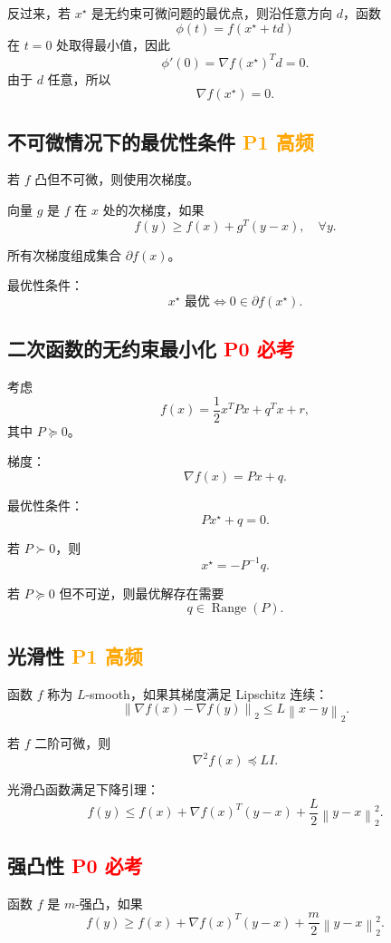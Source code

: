\documentclass[11pt,a4paper]{ctexart}
\newcommand{\norm}[1]{\left\lVert #1 \right\rVert}
\newcommand{\Pzero}{\textcolor{red}{\textbf{P0 必考}}}
\newcommand{\Pone}{\textcolor{orange}{\textbf{P1 高频}}}
\theoremstyle{definition}
\theoremstyle{plain}
\theoremstyle{remark}
\begin{document}
反过来，若 $x^\star$ 是无约束可微问题的最优点，则沿任意方向 $d$，函数
\[
    \phi(t)=f(x^\star+td)
\]
在 $t=0$ 处取得最小值，因此
\[
    \phi'(0)=\nabla f(x^\star)^Td=0.
\]
由于 $d$ 任意，所以
\[
    \nabla f(x^\star)=0.
\]

\subsection{不可微情况下的最优性条件 \Pone}

若 $f$ 凸但不可微，则使用次梯度。

向量 $g$ 是 $f$ 在 $x$ 处的次梯度，如果
\[
    f(y)\ge f(x)+g^T(y-x),\quad \forall y.
\]

所有次梯度组成集合 $\partial f(x)$。

最优性条件：
\[
    x^\star\text{ 最优}
    \Longleftrightarrow
    0\in\partial f(x^\star).
\]

\subsection{二次函数的无约束最小化 \Pzero}

考虑
\[
    f(x)=\frac12x^TPx+q^Tx+r,
\]
其中 $P\succeq0$。

梯度：
\[
    \nabla f(x)=Px+q.
\]

最优性条件：
\[
    Px^\star+q=0.
\]

若 $P\succ0$，则
\[
    x^\star=-P^{-1}q.
\]

若 $P\succeq0$ 但不可逆，则最优解存在需要
\[
    q\in \operatorname{Range}(P).
\]

\subsection{光滑性 \Pone}

函数 $f$ 称为 $L$-smooth，如果其梯度满足 Lipschitz 连续：
\[
    \norm{\nabla f(x)-\nabla f(y)}_2
    \le
    L\norm{x-y}_2.
\]

若 $f$ 二阶可微，则
\[
    \nabla^2 f(x)\preceq LI.
\]

光滑凸函数满足下降引理：
\[
    f(y)
    \le
    f(x)+\nabla f(x)^T(y-x)
    +
    \frac{L}{2}\norm{y-x}_2^2.
\]

\subsection{强凸性 \Pzero}

函数 $f$ 是 $m$-强凸，如果
\[
    f(y)
    \ge
    f(x)+\nabla f(x)^T(y-x)
    +
    \frac{m}{2}\norm{y-x}_2^2.
\]
\end{document}
